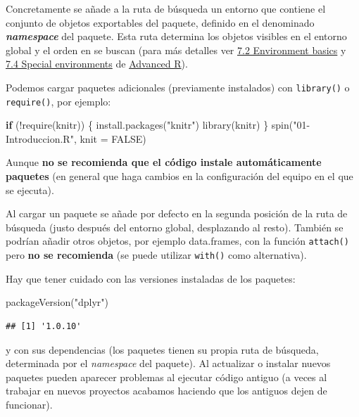 \documentclass[
]{book}
\newenvironment{Shaded}{\begin{snugshade}}{\end{snugshade}}
\newcommand{\AttributeTok}[1]{\textcolor[rgb]{0.77,0.63,0.00}{#1}}
\newcommand{\ConstantTok}[1]{\textcolor[rgb]{0.00,0.00,0.00}{#1}}
\newcommand{\ControlFlowTok}[1]{\textcolor[rgb]{0.13,0.29,0.53}{\textbf{#1}}}
\newcommand{\FunctionTok}[1]{\textcolor[rgb]{0.00,0.00,0.00}{#1}}
\newcommand{\NormalTok}[1]{#1}
\newcommand{\SpecialCharTok}[1]{\textcolor[rgb]{0.00,0.00,0.00}{#1}}
\newcommand{\StringTok}[1]{\textcolor[rgb]{0.31,0.60,0.02}{#1}}
\theoremstyle{break}
\theoremstyle{nonumberplain}
\begin{document}
Concretamente se añade a la ruta de búsqueda un entorno que contiene el conjunto de objetos exportables del paquete, definido en el denominado \textbf{\emph{namespace}} del paquete.
Esta ruta determina los objetos visibles en el entorno global y el orden en se buscan (para más detalles ver \href{https://adv-r.hadley.nz/environments.html\#env-basics}{7.2 Environment basics} y \href{https://adv-r.hadley.nz/environments.html\#special-environments}{7.4 Special environments} de \href{https://adv-r.hadley.nz/index.html}{Advanced R}).

Podemos cargar paquetes adicionales (previamente instalados) con \texttt{library()} o \texttt{require()}, por ejemplo:

\begin{Shaded}
\begin{Highlighting}[]
\ControlFlowTok{if}\NormalTok{ (}\SpecialCharTok{!}\FunctionTok{require}\NormalTok{(knitr)) \{}
  \FunctionTok{install.packages}\NormalTok{(}\StringTok{"knitr"}\NormalTok{)}
  \FunctionTok{library}\NormalTok{(knitr)}
\NormalTok{\}}
\FunctionTok{spin}\NormalTok{(}\StringTok{"01{-}Introduccion.R"}\NormalTok{, }\AttributeTok{knit =} \ConstantTok{FALSE}\NormalTok{)}
\end{Highlighting}
\end{Shaded}

Aunque \textbf{no se recomienda que el código instale automáticamente paquetes} (en general que haga cambios en la configuración del equipo en el que se ejecuta).

Al cargar un paquete se añade por defecto en la segunda posición de la ruta de búsqueda (justo después del entorno global, desplazando al resto).
También se podrían añadir otros objetos, por ejemplo data.frames, con la función \texttt{attach()} pero \textbf{no se recomienda} (se puede utilizar \texttt{with()} como alternativa).

Hay que tener cuidado con las versiones instaladas de los paquetes:

\begin{Shaded}
\begin{Highlighting}[]
\FunctionTok{packageVersion}\NormalTok{(}\StringTok{"dplyr"}\NormalTok{)}
\end{Highlighting}
\end{Shaded}

\begin{verbatim}
## [1] '1.0.10'
\end{verbatim}

y con sus dependencias (los paquetes tienen su propia ruta de búsqueda, determinada por el \emph{namespace} del paquete).
Al actualizar o instalar nuevos paquetes pueden aparecer problemas al ejecutar código antiguo (a veces al trabajar en nuevos proyectos acabamos haciendo que los antiguos dejen de funcionar).
\end{document}
